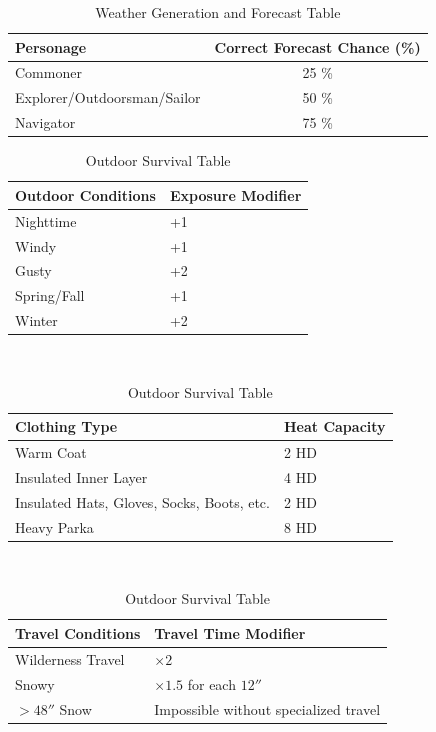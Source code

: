 \documentclass[notitlepage]{article}
\begin{document}
\begin{multicols*}{2}
\begin{table}[t]
  \begin{tabular}{|p{}||c|}
    \hline Personage & Correct Forecast Chance (\%) \\ \hline
    Commoner  & 25 \% \\
    Explorer/Outdoorsman/Sailor & 50 \% \\
    Navigator & 75 \% \\ \hline
  \end{tabular}
  \caption{Weather Generation and Forecast Table}
  \label{tbl:weather}  
\end{table}  


\begin{table}[t]
  \centering \large
  \begin{tabular}{|p{}||p{}|}
    \hline Outdoor Conditions & Exposure Modifier \\ \hline
    Nighttime & +1 \\
    Windy & +1 \\
    Gusty & +2 \\
    Spring/Fall & +1 \\
    Winter & +2 \\ \hline
  \end{tabular} \\

  \begin{tabular}{|p{}||p{}|}
    \hline Clothing Type & Heat Capacity \\ \hline
    Warm Coat & 2 HD \\
    Insulated Inner Layer & 4 HD \\
    Insulated Hats, Gloves, Socks, Boots, etc. & 2 HD \\
    Heavy Parka & 8 HD \\ \hline
  \end{tabular} \\

  \begin{tabular}{|p{}||p{}|}
    \hline Travel Conditions & Travel Time Modifier \\ \hline
    Wilderness Travel & $\times2$ \\
    Snowy & $\times 1.5$ for each $12''$ \\
    $>48''$ Snow & Impossible without specialized travel \\
    \hline
  \end{tabular}
  \caption{Outdoor Survival Table}
  \label{tab:outdoor-survival}
\end{table}


\end{multicols*}
\end{document}
